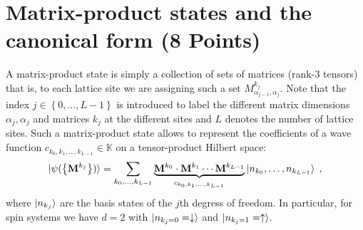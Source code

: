 \documentclass[a4paper, 12pt]{article}
\begin{document}
\section{Matrix-product states and the canonical form \textbf{(8 Points)}}
%
A matrix-product state is simply a collection of sets of matrices (rank-$3$ tensors) that is, to each lattice site we are assigning such a set $M^{k_j}_{\alpha_{j-1}, \alpha_{j}}$.
%
Note that the index $j\in\left\{0, \ldots, L-1\right\}$ is introduced to label the different matrix dimensions $\alpha_j, \alpha_j$ and matrices $k_j$ at the different sites and $L$ denotes the number of lattice sites.
%
Such a matrix-product state allows to represent the coefficients of a wave function $c_{k_0, k_1, \ldots, k_{L-1}} \in\mathbb K$ on a tensor-product Hilbert space:
\begin{equation}
	\ket{\psi(\left\{\mathbf M^{k_j}\right\})} = \sum_{k_0,\ldots,k_{L-1}} \underbrace{\mathbf M^{k_0} \cdot \mathbf M^{k_1} \cdots \mathbf M^{k_{L-1}}}_{c_{k_0, k_1, \ldots, k_{L-1}}} \ket{n_{k_0}, \ldots, n_{k_{L-1}}} \; ,
\end{equation}
where $\ket{n_{k_j}}$ are the basis states of the $j$th degress of freedom.
%
In particular, for spin systems we have $d=2$ with $\ket{n_{k_j=0} = \downarrow}$ and $\ket{n_{k_j=1} = \uparrow}$.
%
\end{document}

